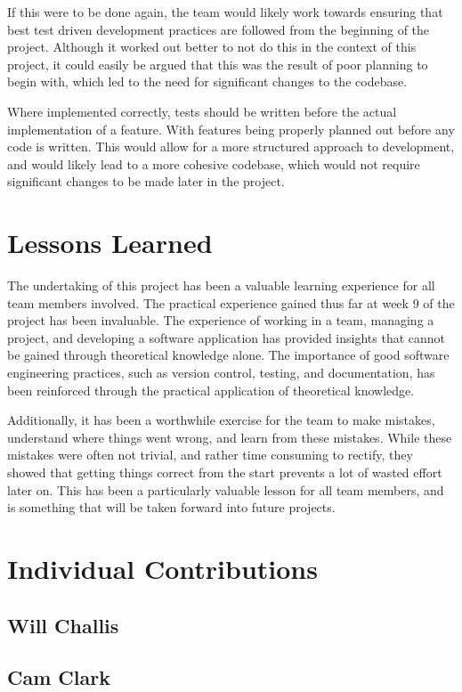 \documentclass[conference]{IEEEtran}
\begin{document}
If this were to be done again, the team would likely work towards ensuring that best test driven development practices are followed from the beginning of the project. Although it worked out better to not do this in the context of this project, it could easily be argued that this was the result of poor planning to begin with, which led to the need for significant changes to the codebase.

Where implemented correctly, tests should be written before the actual implementation of a feature. With features being properly planned out before any code is written. This would allow for a more structured approach to development, and would likely lead to a more cohesive codebase, which would not require significant changes to be made later in the project.

\section{Lessons Learned}
The undertaking of this project has been a valuable learning experience for all team members involved. The practical experience gained thus far at week 9 of the project has been invaluable. The experience of working in a team, managing a project, and developing a software application has provided insights that cannot be gained through theoretical knowledge alone. The importance of good software engineering practices, such as version control, testing, and documentation, has been reinforced through the practical application of theoretical knowledge. 

Additionally, it has been a worthwhile exercise for the team to make mistakes, understand where things went wrong, and learn from these mistakes. While these mistakes were often not trivial, and rather time consuming to rectify, they showed that getting things correct from the start prevents a lot of wasted effort later on. This has been a particularly valuable lesson for all team members, and is something that will be taken forward into future projects.

\section{Individual Contributions}
\subsection{Will Challis}

\subsection{Cam Clark}
\end{document}
